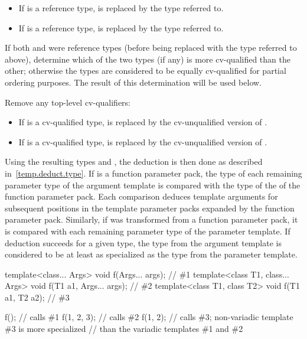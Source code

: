 \begin{itemize}
\item
If
is a reference type,
is replaced by the type referred to.
\item
If
is a reference type,
is replaced by the type referred to.
\end{itemize}

\pnum
If both
and
were reference types (before being replaced with the type referred to
above), determine which of the two types (if any) is more cv-qualified
than the other; otherwise the types are considered to be equally
cv-qualified for partial ordering purposes. The result of this
determination will be used below.

\pnum
Remove any top-level cv-qualifiers:
\begin{itemize}
\item
If
is a cv-qualified type,
is replaced by the cv-unqualified version of
.
\item
If
is a cv-qualified type,
is replaced by the cv-unqualified version of
.
\end{itemize}

\pnum
Using the resulting types
and
,
the deduction is then done as described in~\ref{temp.deduct.type}.
If  is a function parameter pack, the type  of each remaining
parameter type of the argument template is compared with the type  of
the  of the function parameter pack. Each comparison
deduces template arguments for subsequent positions in the template parameter
packs expanded by the function parameter pack.
Similarly, if  was transformed from a function parameter pack,
it is compared with each remaining parameter type of the parameter template.
If deduction succeeds for a given type,
the type from the argument template is considered to be at least as specialized
as the type from the parameter template.
\begin{example}
\begin{codeblock}
template<class... Args>           void f(Args... args);         // \#1
template<class T1, class... Args> void f(T1 a1, Args... args);  // \#2
template<class T1, class T2>      void f(T1 a1, T2 a2);         // \#3

f();                // calls \#1
f(1, 2, 3);         // calls \#2
f(1, 2);            // calls \#3; non-variadic template \#3 is more specialized
                    // than the variadic templates \#1 and \#2
\end{codeblock}
\end{example}


